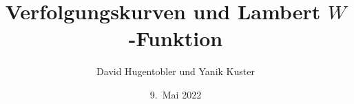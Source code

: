 %
%
%


\beamertemplatenavigationsymbolsempty
\title[Lambert $W$]{Verfolgungskurven und Lambert $W$-Funktion}
\author[D.~H.~und~Y.~K.]{David Hugentobler und Yanik Kuster}
\date[]{9.~Mai 2022}

